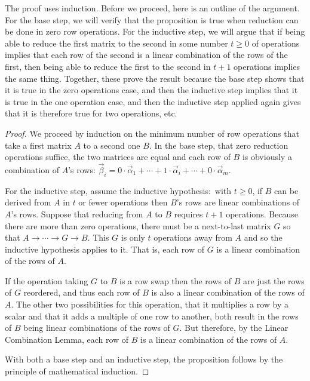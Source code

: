 The proof 
uses induction. %
Before we proceed, here is an outline of the argument.
For the base step, we
will verify that the proposition is true when reduction 
can be done in zero row operations.
For the inductive step, we will 
argue that if being able to reduce the first matrix to the second in some
number $t\geq 0$ of operations implies that each row of the second is a linear
combination of the rows of the first, then being able to reduce the first to
the second in $t+1$ operations implies the same thing.
Together, these prove the result because  
the base step shows that it is true in the zero operations case,
and then the inductive step
implies that it is true in the one operation case, and then the inductive step
applied again gives that it is therefore true for two operations, etc.

\begin{proof}
We proceed by induction on the minimum number of row operations that take a
first matrix $A$ to a second one $B$.
In the base step, that
zero reduction operations suffice, the two matrices are equal and each 
row of $B$ is obviously a combination of
$A$'s rows: $\vec{\beta}_i
  =0\cdot\vec{\alpha}_1+\cdots+1\cdot\vec{\alpha}_i+\cdots+0\cdot\vec{\alpha}_m$.

For the inductive step, assume the inductive hypothesis:~with $t\geq 0$,
if \( B \) can be derived from \( A \) in \( t \) or fewer operations 
then \( B\)'s rows are linear combinations of $A$'s rows.
Suppose that reducing from \( A \) to \( B \) requires $t+1$ operations.
Because there are more than zero operations, 
there must be a next-to-last matrix $G$  
so that $A\longrightarrow\cdots\longrightarrow G\longrightarrow B$.
This \( G \) is only $t$ operations away from \( A \) and so the inductive
hypothesis applies to it. 
That is, each row of \( G \)
is a linear combination of the rows of \( A \).

If the operation taking \( G \) to \( B \) is a row swap then
the rows of $B$ are just the rows of $G$ reordered, and thus each row of $B$
is also a linear combination of the rows of $A$.
The other two possibilities for this operation, that it multiplies a 
row by a scalar and that it adds a multiple of one row to another, both result
in the rows of $B$ being linear combinations of the rows of $G$.
But therefore, by the Linear Combination Lemma, each row of $B$ is a linear
combination of the rows of $A$.

With both a base step and an inductive step,  
the proposition follows by the principle of mathematical induction.
\end{proof}

